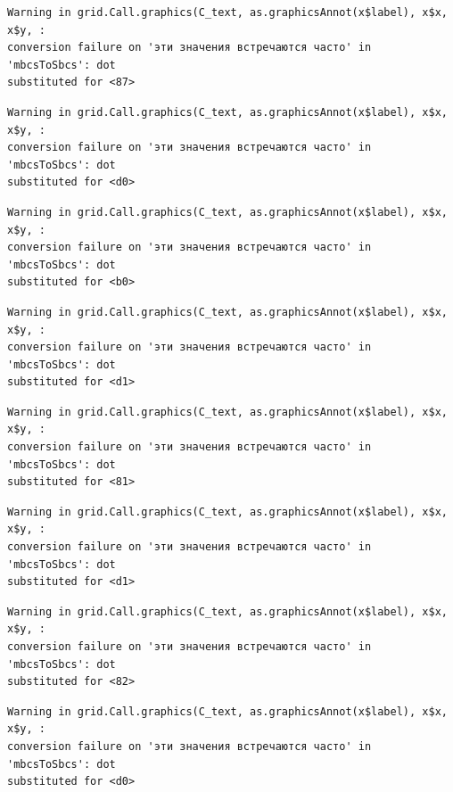 \documentclass[
  letterpaper,
]{scrbook}
\theoremstyle{definition}
\theoremstyle{remark}
\begin{document}
\begin{verbatim}
Warning in grid.Call.graphics(C_text, as.graphicsAnnot(x$label), x$x, x$y, :
conversion failure on 'эти значения встречаются часто' in 'mbcsToSbcs': dot
substituted for <87>
\end{verbatim}

\begin{verbatim}
Warning in grid.Call.graphics(C_text, as.graphicsAnnot(x$label), x$x, x$y, :
conversion failure on 'эти значения встречаются часто' in 'mbcsToSbcs': dot
substituted for <d0>
\end{verbatim}

\begin{verbatim}
Warning in grid.Call.graphics(C_text, as.graphicsAnnot(x$label), x$x, x$y, :
conversion failure on 'эти значения встречаются часто' in 'mbcsToSbcs': dot
substituted for <b0>
\end{verbatim}

\begin{verbatim}
Warning in grid.Call.graphics(C_text, as.graphicsAnnot(x$label), x$x, x$y, :
conversion failure on 'эти значения встречаются часто' in 'mbcsToSbcs': dot
substituted for <d1>
\end{verbatim}

\begin{verbatim}
Warning in grid.Call.graphics(C_text, as.graphicsAnnot(x$label), x$x, x$y, :
conversion failure on 'эти значения встречаются часто' in 'mbcsToSbcs': dot
substituted for <81>
\end{verbatim}

\begin{verbatim}
Warning in grid.Call.graphics(C_text, as.graphicsAnnot(x$label), x$x, x$y, :
conversion failure on 'эти значения встречаются часто' in 'mbcsToSbcs': dot
substituted for <d1>
\end{verbatim}

\begin{verbatim}
Warning in grid.Call.graphics(C_text, as.graphicsAnnot(x$label), x$x, x$y, :
conversion failure on 'эти значения встречаются часто' in 'mbcsToSbcs': dot
substituted for <82>
\end{verbatim}

\begin{verbatim}
Warning in grid.Call.graphics(C_text, as.graphicsAnnot(x$label), x$x, x$y, :
conversion failure on 'эти значения встречаются часто' in 'mbcsToSbcs': dot
substituted for <d0>
\end{verbatim}
\end{document}
